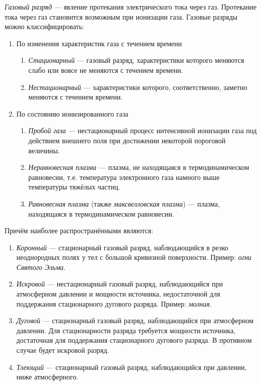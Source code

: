 \documentclass[a4paper, usenames, dvipsnames]{article}
\begin{document}
{\it Газовый разряд} --- явление протекания электрического тока через газ.
Протекание тока через газ становится возможным при ионизации газа.
Газовые разряды можно классифицировать:
\begin{enumerate}
    \item По изменения характеристик газа с течением времени
          \begin{enumerate}
              \item {\it Стационарный} --- газовый разряд, характеристики которого меняются слабо
                    или вовсе не меняются с течением времени.
              \item {\it Нестационарный}  --- характеристики которого, соответственно,
                    заметно меняются с течением времени.
          \end{enumerate}
    \item По состоянию ионизированного газа
          \begin{enumerate}
              \item {\it Пробой газа} --- нестационарный процесс интенсивной ионизации газа
                    под действием внешнего поля при достижении некоторой пороговой величины.
              \item {\it Неравновесная плазма} --- плазма,
                    не находящаяся в термодинамическом равновесии,
                    т.е. температура электронного газа намного выше температуры тяжёлых частиц.
              \item {\it Равновесная плазма} (также {\it максвелловская плазма}) --- плазма,
                    находящаяся в термодинамическом равновесии.
          \end{enumerate}
\end{enumerate}
Причём наиболее распространёнными являются:
\begin{enumerate}
    \item {\it Коронный} --- стационарный газовый разряд,
          наблюдающийся в резко неоднородных полях у тел
          с большой кривизной поверхности. Пример: {\it огни Святого Эльма}.
    \item {\it Искровой} --- нестационарный газовый разряд,
          наблюдающийся при атмосферном давлении и мощности источника,
          недостаточной для поддержания стационарного дугового разряда.
          Пример: {\it молния}.
    \item {\it Дуговой} --- стационарный газовый разряд,
          наблюдающийся при атмосферном давлении. Для стационарности разряда
          требуется мощности источника, достаточная для поддержания стационарного
          дугового разряда. В противном случае будет искровой разряд.
    \item {\it Тлеющий} --- стационарный газовый разряд,
          наблюдающийся при давлении, ниже атмосферного.
\end{enumerate}
\end{document}
